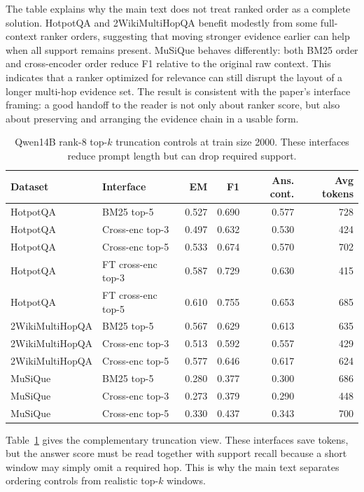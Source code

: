 \documentclass[a4paper,fleqn]{cas-sc}
\begin{document}
The table explains why the main text does not treat ranked order as a complete
solution. HotpotQA and 2WikiMultiHopQA benefit modestly from some full-context
ranker orders, suggesting that moving stronger evidence earlier can help when
all support remains present. MuSiQue behaves differently: both BM25 order and
cross-encoder order reduce F1 relative to the original raw context. This
indicates that a ranker optimized for relevance can still disrupt the layout of
a longer multi-hop evidence set. The result is consistent with the paper's
interface framing: a good handoff to the reader is not only about ranker score,
but also about preserving and arranging the evidence chain in a usable form.

\begin{table}[!hbp]
\centering
\caption{Qwen14B rank-8 top-$k$ truncation controls at train size 2000. These
interfaces reduce prompt length but can drop required support.}
\label{tab:appendix-qwen14b-topk-controls}
\scriptsize
\setlength{\tabcolsep}{4pt}
\begin{tabular}{llrrrr}
\toprule
Dataset & Interface & EM & F1 & Ans. cont. & Avg tokens \\
\midrule
HotpotQA & BM25 top-5 & 0.527 & 0.690 & 0.577 & 728 \\
HotpotQA & Cross-enc top-3 & 0.497 & 0.632 & 0.530 & 424 \\
HotpotQA & Cross-enc top-5 & 0.533 & 0.674 & 0.570 & 702 \\
HotpotQA & FT cross-enc top-3 & 0.587 & 0.729 & 0.630 & 415 \\
HotpotQA & FT cross-enc top-5 & 0.610 & 0.755 & 0.653 & 685 \\
\midrule
2WikiMultiHopQA & BM25 top-5 & 0.567 & 0.629 & 0.613 & 635 \\
2WikiMultiHopQA & Cross-enc top-3 & 0.513 & 0.592 & 0.557 & 429 \\
2WikiMultiHopQA & Cross-enc top-5 & 0.577 & 0.646 & 0.617 & 624 \\
\midrule
MuSiQue & BM25 top-5 & 0.280 & 0.377 & 0.300 & 686 \\
MuSiQue & Cross-enc top-3 & 0.273 & 0.379 & 0.290 & 448 \\
MuSiQue & Cross-enc top-5 & 0.330 & 0.437 & 0.343 & 700 \\
\bottomrule
\end{tabular}
\end{table}

Table~\ref{tab:appendix-qwen14b-topk-controls} gives the complementary
truncation view. These interfaces save tokens, but the answer score must be read
together with support recall because a short window may simply omit a required
hop. This is why the main text separates ordering controls from realistic
top-$k$ windows.
\end{document}
